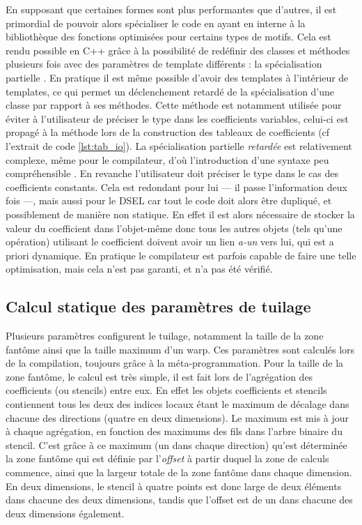 En supposant que certaines formes sont plus performantes que d'autres, il est primordial de pouvoir alors spécialiser le code en ayant en interne à la bibliothèque des fonctions optimisées pour certains types de motifs. Cela est rendu possible en \textsf{C++} grâce à la possibilité de redéfinir des classes et méthodes plusieurs fois avec des paramètres de template différents : la spécialisation partielle \cite{Web1}. En pratique il est même possible d'avoir des templates à l'intérieur de templates, ce qui permet un déclenchement retardé de la spécialisation d'une classe par rapport à ses méthodes. Cette méthode est notamment utilisée pour éviter à l'utilisateur de préciser le type dans les coefficients variables, celui-ci est propagé à la méthode lors de la construction des tableaux de coefficients (cf l'extrait de code \ref{lst:tab_io}). La spécialisation partielle \emph{retardée} est relativement complexe, même pour le compilateur, d'où l'introduction d'une syntaxe peu compréhensible \cite{Web2}. En revanche l'utilisateur doit préciser le type dans le cas des coefficients constants. Cela est redondant pour lui --- il passe l'information deux fois ---, mais aussi pour le DSEL car tout le code doit alors être dupliqué, et possiblement de manière non statique. En effet il est alors nécessaire de stocker la valeur du coefficient dans l'objet-même donc tous les autres objets (tels qu'une opération) utilisant le coefficient doivent avoir un lien \emph{a-un} vers lui, qui est a priori dynamique. En pratique le compilateur est parfois capable de faire une telle optimisation, mais cela n'est pas garanti, et n'a pas été vérifié.


\subsection{Calcul statique des paramètres de tuilage}
\label{sec:param_tuile}

Plusieurs paramètres configurent le tuilage, notamment la taille de la zone fantôme ainsi que la taille maximum d'un warp. Ces paramètres sont calculés lors de la compilation, toujours grâce à la méta-programmation. Pour la taille de la zone fantôme, le calcul est très simple, il est fait lors de l'agrégation des coefficients (ou stencils) entre eux. En effet les objets coefficients et stencils contiennent tous les deux des indices locaux étant le maximum de décalage dans chacune des directions (quatre en deux dimensions). Le maximum est mis à jour à chaque agrégation, en fonction des maximums des fils dans l'arbre binaire du stencil. C'est grâce à ce maximum (un dans chaque direction) qu'est déterminée la zone fantôme qui est définie par l'\emph{offset} à partir duquel la zone de calculs commence, ainsi que la largeur totale de la zone fantôme dans chaque dimension. En deux dimensions, le stencil à quatre points est donc large de deux éléments dans chacune des deux dimensions, tandis que l'offset est de un dans chacune des deux dimensions également.

